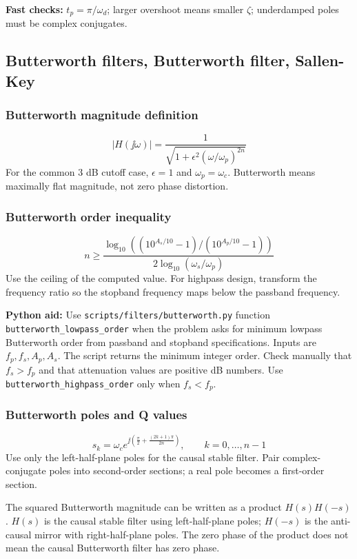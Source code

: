 \textbf{Fast checks:} \(t_p=\pi/\omega_d\); larger overshoot means smaller \(\zeta\); underdamped poles must be complex conjugates.

\subsection{Butterworth filters, Butterworth filter, Sallen-Key}

\subsubsection{Butterworth magnitude definition}
\[
|H(\jj\omega)|=\frac{1}{\sqrt{1+\epsilon^2(\omega/\omega_p)^{2n}}}
\]
For the common \(3\) dB cutoff case, \(\epsilon=1\) and \(\omega_p=\omega_c\). Butterworth means maximally flat magnitude, not zero phase distortion.

\subsubsection{Butterworth order inequality}
\[
n\ge
\frac{\log_{10}\left((10^{A_s/10}-1)/(10^{A_p/10}-1)\right)}
{2\log_{10}(\omega_s/\omega_p)}
\]
Use the ceiling of the computed value. For highpass design, transform the frequency ratio so the stopband frequency maps below the passband frequency.

\textbf{Python aid:} Use \texttt{scripts/filters/butterworth.py} function \texttt{butterworth\_lowpass\_order} when the problem asks for minimum lowpass Butterworth order from passband and stopband specifications. Inputs are \(f_p,f_s,A_p,A_s\). The script returns the minimum integer order. Check manually that \(f_s>f_p\) and that attenuation values are positive dB numbers. Use \texttt{butterworth\_highpass\_order} only when \(f_s<f_p\).

\subsubsection{Butterworth poles and Q values}
\[
s_k=\omega_c e^{\jj\left(\frac{\pi}{2}+\frac{(2k+1)\pi}{2n}\right)},\qquad k=0,\ldots,n-1
\]
Use only the left-half-plane poles for the causal stable filter. Pair complex-conjugate poles into second-order sections; a real pole becomes a first-order section.

The squared Butterworth magnitude can be written as a product \(H(s)H(-s)\). \(H(s)\) is the causal stable filter using left-half-plane poles; \(H(-s)\) is the anti-causal mirror with right-half-plane poles. The zero phase of the product does not mean the causal Butterworth filter has zero phase.

